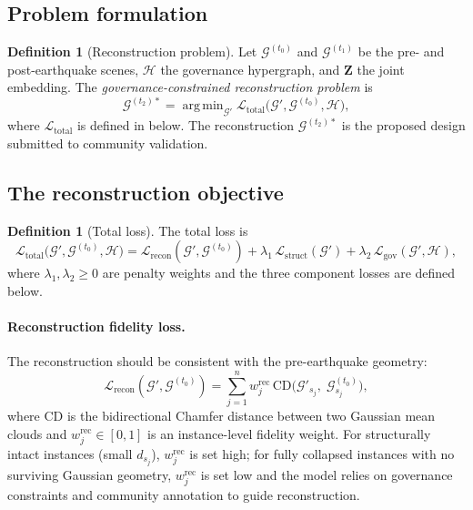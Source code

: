 \documentclass[11pt,a4paper]{article}
\theoremstyle{plain}
\theoremstyle{definition}
\newtheorem{definition}[theorem]{Definition}
\theoremstyle{remark}
\DeclareMathOperator*{\argmin}{arg\,min}
\newcommand{\GS}{\mathcal{G}}
\newcommand{\HG}{\mathcal{H}}
\newcommand{\Lrec}{\mathcal{L}_{\mathrm{recon}}}
\newcommand{\Lstruct}{\mathcal{L}_{\mathrm{struct}}}
\newcommand{\Lgov}{\mathcal{L}_{\mathrm{gov}}}
\newcommand{\Ltot}{\mathcal{L}_{\mathrm{total}}}
\begin{document}
\subsection{Problem formulation}
\label{sec:layer4_problem}

\begin{definition}[Reconstruction problem]
\label{def:recon_problem}
Let $\GS^{(t_0)}$ and $\GS^{(t_1)}$ be the pre- and post-earthquake
scenes, $\HG$ the governance hypergraph, and $\mathbf{Z}$ the joint
embedding. The \emph{governance-constrained reconstruction problem} is
\[
  \GS^{(t_2)*}
  = \argmin_{\GS'}
    \Ltot\!\bigl(\GS', \GS^{(t_0)}, \HG\bigr),
\]
where $\Ltot$ is defined in  below. The
reconstruction $\GS^{(t_2)*}$ is the proposed design submitted to
community validation.
\end{definition}

\subsection{The reconstruction objective}
\label{sec:layer4_objective}

\begin{definition}[Total loss]
\label{def:total_loss}
The total loss is
\begin{equation}
  \Ltot\!\bigl(\GS', \GS^{(t_0)}, \HG\bigr)
  = \Lrec(\GS', \GS^{(t_0)})
  + \lambda_1\,\Lstruct(\GS')
  + \lambda_2\,\Lgov(\GS', \HG),
  \label{eq:total_loss}
\end{equation}
where $\lambda_1, \lambda_2 \geq 0$ are penalty weights and the three
component losses are defined below.
\end{definition}

\paragraph{Reconstruction fidelity loss.}
The reconstruction should be consistent with the pre-earthquake geometry:
\begin{equation}
  \Lrec(\GS', \GS^{(t_0)})
  = \sum_{j=1}^{n} w_j^{\mathrm{rec}}\,
    \mathrm{CD}\!\bigl(\GS'_{s_j},\; \GS^{(t_0)}_{s_j}\bigr),
  \label{eq:lrec}
\end{equation}
where $\mathrm{CD}$ is the bidirectional Chamfer distance between two
Gaussian mean clouds and $w_j^{\mathrm{rec}} \in [0,1]$ is an
instance-level fidelity weight. For structurally intact instances
(small $d_{s_j}$), $w_j^{\mathrm{rec}}$ is set high; for fully
collapsed instances with no surviving Gaussian geometry,
$w_j^{\mathrm{rec}}$ is set low and the model relies on governance
constraints and community annotation to guide reconstruction.
\end{document}

